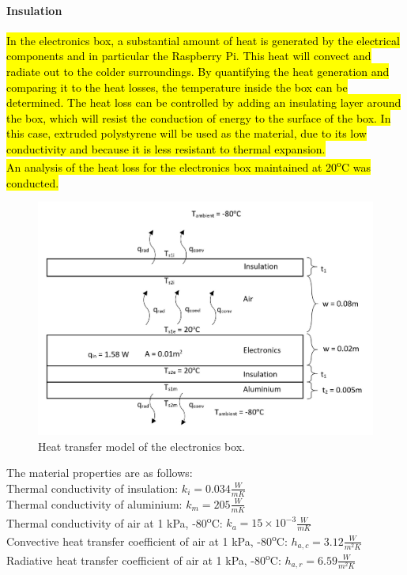 \paragraph{Insulation}

\hl{In the electronics box, a substantial amount of heat is generated by the electrical components and in particular the Raspberry Pi. This heat will convect and radiate out to the colder surroundings. By quantifying the heat generation and comparing it to the heat losses, the temperature inside the box can be determined. The heat loss can be controlled by adding an insulating layer around the box, which will resist the conduction of energy to the surface of the box. In this case, extruded polystyrene will be used as the material, due to its low conductivity and because it is less resistant to thermal expansion.} \\

\hl{An analysis of the heat loss for the electronics box maintained at 20\textsuperscript{o}C was conducted.} \\

	\begin{figure}[h!]
    \centering
    \includegraphics[scale=0.6]{4-experiment-design/img/mechanical/thermaldiagram.JPG}
	\caption{Heat transfer model of the electronics box.}
	\label{fig:thermaldiagram}
	\end{figure}

The material properties are as follows: \\

Thermal conductivity of insulation: $ k_{i} = 0.034 \frac{W}{m K} $ \\
Thermal conductivity of aluminium: $ k_{m} = 205 \frac{W}{m K} $ \\
Thermal conductivity of air at 1 kPa, -80\textsuperscript{o}C: $ k_{a} = 15\times10^{-3} \frac{W}{m K} $ \\ 
Convective heat transfer coefficient of air at 1 kPa, -80\textsuperscript{o}C: $ h_{a,c} = 3.12 \frac{W}{m^{2} K} $ \\ 
Radiative heat transfer coefficient of air at 1 kPa, -80\textsuperscript{o}C: $ h_{a,r} = 6.59 \frac{W}{m^{2} K} $ \\ 

